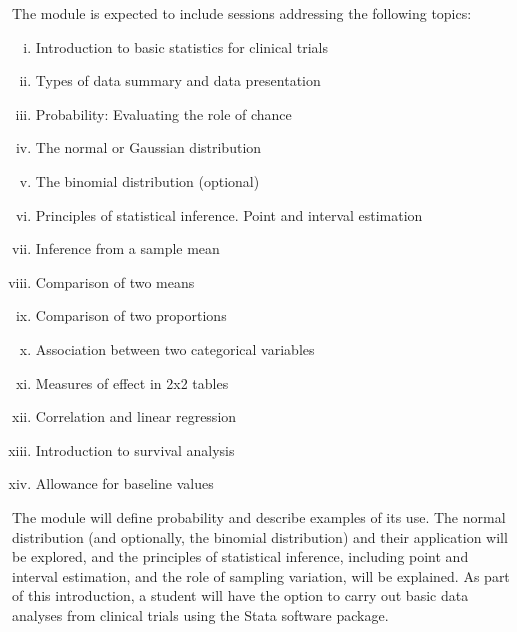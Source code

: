 The module is expected to include sessions addressing the following topics:

\begin{enumerate}[(i)]
\item  Introduction to basic statistics for clinical trials\item  Types of data summary and data presentation
\item  Probability: Evaluating the role of chance\item  The normal or Gaussian distribution\item  The binomial distribution (optional)
\item  Principles of statistical inference. Point and interval estimation\item  Inference from a sample mean\item  Comparison of two means\item  Comparison of two proportions\item  Association between two categorical variables\item  Measures of effect in 2x2 tables\item  Correlation and linear regression\item  Introduction to survival analysis\item  Allowance for baseline values

\end{enumerate}
The module will define probability and describe examples of its use. The normal
distribution (and optionally, the binomial distribution) and their application will
be explored, and the principles of statistical inference, including point and
interval estimation, and the role of sampling variation, will be explained. As part
of this introduction, a student will have the option to carry out basic data
analyses from clinical trials using the Stata software package.
